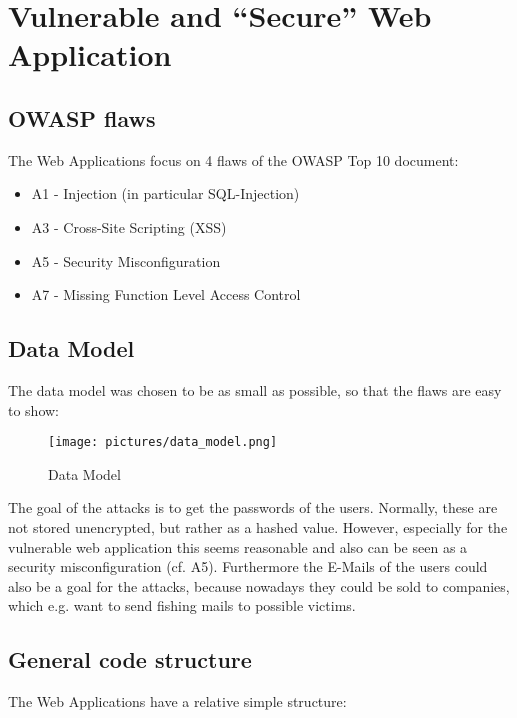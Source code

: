 \section{Vulnerable and ``Secure'' Web Application}
\subsection{OWASP flaws}

The Web Applications focus on 4 flaws of the OWASP Top 10 document:

\begin{itemize}
\item A1 - Injection (in particular SQL-Injection)
\item A3 - Cross-Site Scripting (XSS)
\item A5 - Security Misconfiguration
\item A7 - Missing Function Level Access Control
\end{itemize}


\subsection{Data Model}

The data model was chosen to be as small as possible, so that the flaws are easy to show:

\begin{figure}[htbp]
  \begin{center}
    \texttt{[image: pictures/data\_model.png]}
    \caption{Data Model}
    \label{fig:data_model}
  \end{center}
\end{figure}

The goal of the attacks is to get the passwords of the users. Normally, these are  not stored unencrypted, but rather as a hashed value. However, especially for the vulnerable web application this seems reasonable and also can be seen as a security misconfiguration (cf. A5). Furthermore the E-Mails of the users could also be a goal for the attacks, because nowadays they could be sold to companies, which e.g. want to send fishing mails to possible victims. 

\clearpage
\subsection{General code structure}

The Web Applications have a relative simple structure:
\\

